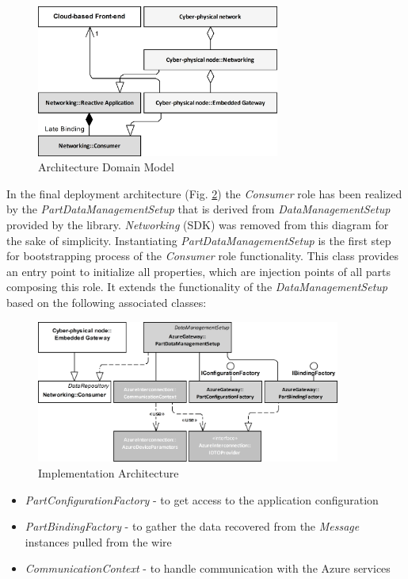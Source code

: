 \documentclass[runningheads]{llncs}
\begin{document}
\begin{figure}
      \centering
      \includegraphics[width=8cm]{../../.Media/ImplementationDomainModel.png}
      \caption{Architecture Domain Model}\label{figure3.ImplementationDomainModel}
\end{figure}


In the final deployment architecture (Fig. \ref{figure4.ImplementationArchitecture}) the \emph{Consumer} role has been realized by the \emph{PartDataManagementSetup} that is derived from \emph{DataManagementSetup} provided by the library. \emph{Networking} (SDK) was removed from this diagram for the sake of simplicity. Instantiating \emph{PartDataManagementSetup} is the first step for bootstrapping process of the \emph{Consumer} role functionality. This class provides an entry point to initialize all properties, which are injection points of all parts composing this role. It extends the functionality of the \emph{DataManagementSetup} based on the following associated classes:

\begin{figure}
      \centering
      \includegraphics[width=10cm]{../../.Media/ImplementationArchitecture.png}
      \caption{Implementation Architecture}\label{figure4.ImplementationArchitecture}
\end{figure}

\begin{itemize}
      \item \emph{PartConfigurationFactory} - to get access to the application configuration
      \item \emph{PartBindingFactory} - to gather the data recovered from the \emph{Message} instances pulled from the wire
      \item \emph{CommunicationContext} - to handle communication with the Azure services
\end{itemize}
\end{document}
